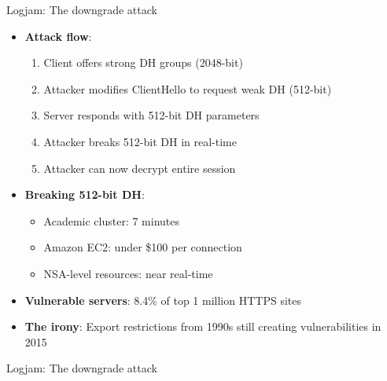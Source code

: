 \documentclass[aspectratio=169, lualatex, handout]{beamer}
\begin{document}
\begin{frame}{Logjam: The downgrade attack}
	\begin{itemize}
		\item \textbf{Attack flow}:
		      \begin{enumerate}
			      \item Client offers strong DH groups (2048-bit)
			      \item Attacker modifies ClientHello to request weak DH (512-bit)
			      \item Server responds with 512-bit DH parameters
			      \item Attacker breaks 512-bit DH in real-time
			      \item Attacker can now decrypt entire session
		      \end{enumerate}
		\item \textbf{Breaking 512-bit DH}:
		      \begin{itemize}
			      \item Academic cluster: 7 minutes
			      \item Amazon EC2: under \$100 per connection
			      \item NSA-level resources: near real-time
		      \end{itemize}
		\item \textbf{Vulnerable servers}: 8.4\% of top 1 million HTTPS sites
		\item \textbf{The irony}: Export restrictions from 1990s still creating vulnerabilities in 2015
	\end{itemize}
\end{frame}

\begin{frame}{Logjam: The downgrade attack}
\end{frame}
\end{document}
